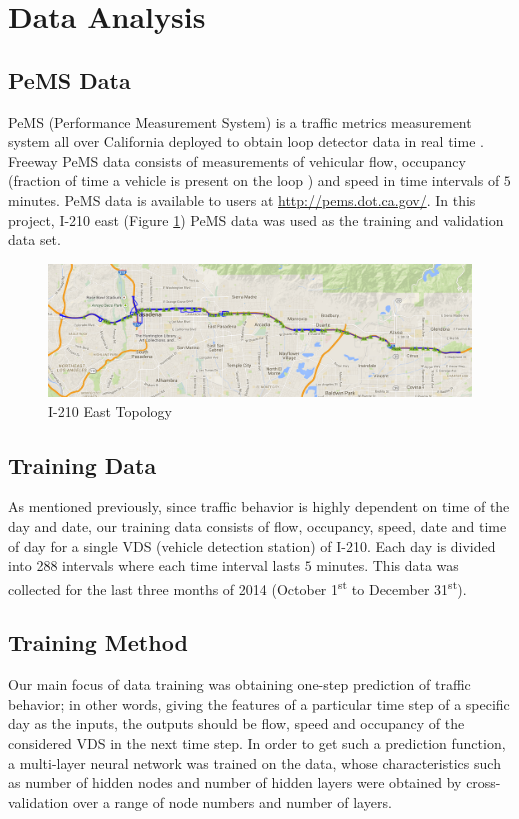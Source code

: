 \documentclass[twocolumn,10pt]{asme2e}
\begin{document}
\section{Data Analysis}
\subsection{PeMS Data} 
PeMS (Performance Measurement System) is a traffic metrics measurement system all over California deployed to obtain loop detector data in real time \cite{PemsPravin}. Freeway PeMS data consists of measurements of vehicular flow, occupancy (fraction of time a vehicle is present on the loop \cite{occupancy}) and speed in time intervals of $5$ minutes. PeMS data is available to users at \url{http://pems.dot.ca.gov/}. In this project, I-210 east (Figure \ref{fig:210}) PeMS data was used as the training and validation data set. 
\begin{figure}[h]
    \centering
    \includegraphics[width=1\linewidth]{210.png}
    \caption{I-210 East Topology}
    \label{fig:210}
\end{figure} 


\subsection{Training Data}
As mentioned previously, since traffic behavior is highly dependent on time of the day and date, our training data consists of flow, occupancy, speed, date and time of day for a single VDS (vehicle detection station) of I-210. Each day is divided into 288 intervals where each time interval lasts $5$ minutes. This data was collected for the last three months of 2014 (October 1\textsuperscript{st} to December 31\textsuperscript{st}).
\subsection{Training Method}
Our main focus of data training was obtaining one-step prediction of traffic behavior; in other words, giving the features of a particular time step of a specific day as the inputs, the outputs should be flow, speed and occupancy of the considered VDS in the next time step. In order to get such a prediction function, a multi-layer neural network was trained on the data, whose characteristics such as number of hidden nodes and number of hidden layers were obtained by cross-validation over a range of node numbers and number of layers.
\end{document}
